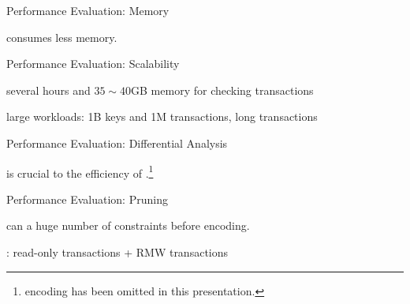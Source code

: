 \begin{frame}{Performance Evaluation: Memory}
	\centerline{\polysi{} consumes less memory.}
\end{frame}

\begin{frame}{Performance Evaluation: Scalability}
	\begin{center}
		several hours and $35 \sim 40$GB memory for checking  transactions

		\vspace{0.30cm}
		\vspace{0.30cm}

		large workloads: 1B keys and 1M transactions, long transactions
	\end{center}
\end{frame}

\begin{frame}{Performance Evaluation: Differential Analysis}
	\begin{center}
		 is crucial to the efficiency of \polysi.\footnote{
			 encoding has been omitted in this presentation.
		}

		\vspace{0.30cm}
	\end{center}
\end{frame}

\begin{frame}{Performance Evaluation: Pruning}
	\begin{center}
		\polysi{} can  a huge number of constraints before encoding.

		\vspace{0.30cm}
		
		\vspace{0.30cm}

		: read-only transactions + RMW transactions
	\end{center}
\end{frame}
